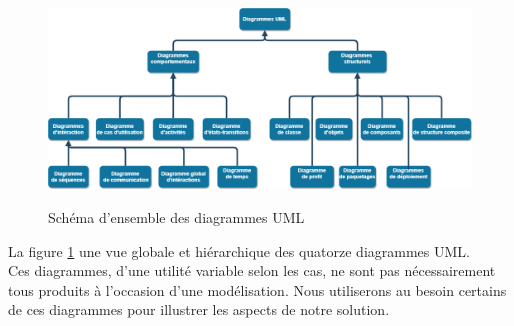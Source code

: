 \begin{figure}[h!]
	\centering
	\begin{minipage}{18cm}
		\centering
		{\includegraphics[height=0.27\textheight]{fig/Uml-Diagrams-overview.png}}
	\end{minipage}
	\caption{Schéma d'ensemble des diagrammes UML}
	\label{fig:7.1}
\end{figure}
La figure \ref{fig:7.1} une vue globale et hiérarchique des quatorze diagrammes UML.\\
Ces diagrammes, d'une utilité variable selon les cas, ne sont pas nécessairement tous produits à l'occasion d'une modélisation. Nous utiliserons au besoin certains de ces diagrammes pour illustrer les aspects de notre solution.

\clearpage 

